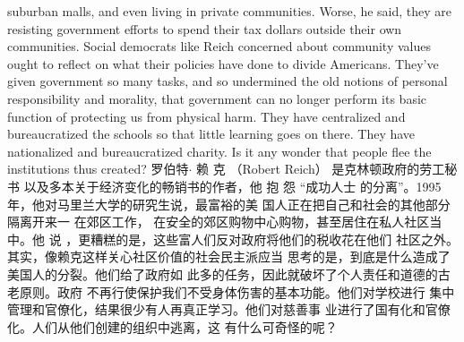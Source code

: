 \begin{paracol}{2}
suburban malls, and even living in private communities. Worse,
he said, they are resisting government efforts to spend their tax
dollars outside their own communities. Social democrats like
Reich concerned about community values ought to reflect on
what their policies have done to divide Americans. They've
given government so many tasks, and so undermined the old
notions of personal responsibility and morality, that government can no longer perform its basic function of protecting us
from physical harm. They have centralized and bureaucratized
the schools so that little learning goes on there. They have nationalized and bureaucratized charity. Is it any wonder that people flee the institutions thus created?
\switchcolumn
罗伯特$\cdot$ 赖 克 （Robert  Reich） 是克林顿政府的劳工秘书
以及多本关于经济变化的畅销书的作者，他 抱 怨 “成功人士
的分离”。1995年，他对马里兰大学的研究生说，最富裕的美
国人正在把自己和社会的其他部分隔离开来一 在郊区工作，
在安全的郊区购物中心购物，甚至居住在私人社区当中。他
说 ，更糟糕的是，这些富人们反对政府将他们的税收花在他们
社区之外。其实，像赖克这样关心社区价值的社会民主派应当
思考的是，到底是什么造成了美国人的分裂。他们给了政府如
此多的任务，因此就破坏了个人责任和道德的古老原则。政府
不再行使保护我们不受身体伤害的基本功能。他们对学校进行
集中管理和官僚化，结果很少有人再真正学习。他们对慈善事
业进行了国有化和官僚化。人们从他们创建的组织中逃离，这
有什么可奇怪的呢？


\end{paracol}
